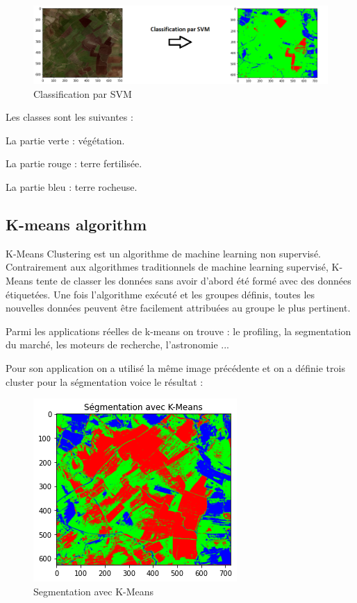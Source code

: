 \documentclass[12pt, openany]{report}
\begin{document}
\begin{figure}[h]
\centering
\hspace*{-0.5in}
\includegraphics[scale=0.9]{classification.png}
\caption{Classification par SVM}
\end{figure}

\noindent Les classes sont les suivantes : 

\begin{mylist}
\item La partie verte : végétation.
\item La partie rouge : terre fertilisée.
\item La partie bleu : terre rocheuse.
\end{mylist}

\subsection{K-means algorithm}


K-Means Clustering est un algorithme de machine learning non supervisé. Contrairement aux algorithmes traditionnels de machine learning supervisé, K-Means tente de classer les données sans avoir d'abord été formé avec des données étiquetées. Une fois l'algorithme exécuté et les groupes définis, toutes les nouvelles données peuvent être facilement attribuées au groupe le plus pertinent.
\par 
Parmi les applications réelles de k-means on trouve : le profiling, la segmentation du marché, les moteurs de recherche, l'astronomie ...\cite{k-means}

\par
Pour son application on a utilisé la même image précédente et on a définie trois cluster pour la ségmentation voice le résultat : 

\begin{figure}[ht]
\centering
\includegraphics[scale=0.9]{kmeans.png}
\caption{Segmentation avec K-Means}
\end{figure}
\end{document}
